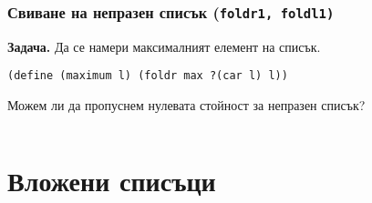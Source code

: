 \documentclass{beamer}
\begin{document}
\begin{frame}
  \frametitle{Свиване на непразен списък (\tt{foldr1, foldl1})}

  \textbf{Задача.} Да се намери максималният елемент на списък.
  \pause

  \tt{(define (maximum l) (foldr max ?{(car l)} l))}
  \pause\pause

  \vspace{1em}
  Можем ли да пропуснем нулевата стойност за непразен списък?

  \begin{columns}[t,onlytextwidth]




    \vspace{1em}

    \vspace{2em}

  \end{columns}
\end{frame}

\section{Вложени списъци}

\newcommand{\hzero}{\textcolor{red}}
\newcommand{\vzero}{\textcolor{orange}}
\newcommand{\hstep}{\textcolor{green}}
\newcommand{\vstep}{\textcolor{cyan}}
\end{document}
